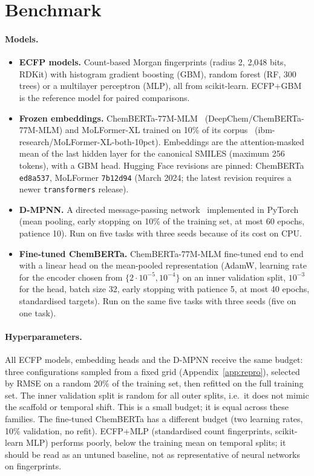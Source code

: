 \section{Benchmark}\label{sec:bench}
\paragraph{Models.}
\begin{itemize}[nosep]
\item \textbf{ECFP models.} Count-based Morgan fingerprints (radius 2, 2{,}048 bits, RDKit) with histogram gradient boosting (GBM), random forest (RF, 300 trees) or a multilayer perceptron (MLP), all from scikit-learn. ECFP+GBM is the reference model for paired comparisons.
\item \textbf{Frozen embeddings.} ChemBERTa-77M-MLM~\cite{ahmad2022chemberta2} (DeepChem/ChemBERTa-77M-MLM) and MoLFormer-XL trained on 10\% of its corpus~\cite{ross2022molformer} (ibm-research/MoLFormer-XL-both-10pct). Embeddings are the attention-masked mean of the last hidden layer for the canonical SMILES (maximum 256 tokens), with a GBM head. Hugging Face revisions are pinned: ChemBERTa \texttt{ed8a537}, MoLFormer \texttt{7b12d94} (March 2024; the latest revision requires a newer \texttt{transformers} release).
\item \textbf{D-MPNN.} A directed message-passing network~\cite{yang2019analyzing} implemented in PyTorch (mean pooling, early stopping on 10\% of the training set, at most 60 epochs, patience 10). Run on five tasks with three seeds because of its cost on CPU.
\item \textbf{Fine-tuned ChemBERTa.} ChemBERTa-77M-MLM fine-tuned end to end with a linear head on the mean-pooled representation (AdamW, learning rate for the encoder chosen from $\{2\cdot10^{-5},10^{-4}\}$ on an inner validation split, $10^{-3}$ for the head, batch size 32, early stopping with patience 5, at most 40 epochs, standardised targets). Run on the same five tasks with three seeds (five on one task).
\end{itemize}

\paragraph{Hyperparameters.}
All ECFP models, embedding heads and the D-MPNN receive the same budget: three configurations sampled from a fixed grid (Appendix~\ref{app:repro}), selected by RMSE on a random 20\% of the training set, then refitted on the full training set. The inner validation split is random for all outer splits, i.e.\ it does not mimic the scaffold or temporal shift. This is a small budget; it is equal across these families. The fine-tuned ChemBERTa has a different budget (two learning rates, 10\% validation, no refit). ECFP+MLP (standardised count fingerprints, scikit-learn MLP) performs poorly, below the training mean on temporal splits; it should be read as an untuned baseline, not as representative of neural networks on fingerprints.

